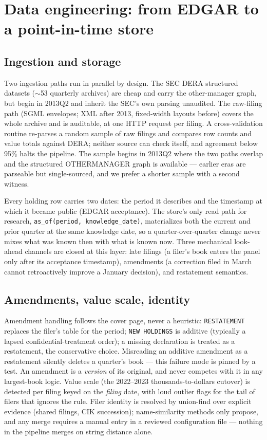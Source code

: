 \section{Data engineering: from EDGAR to a point-in-time store}
\label{sec:data}

\subsection{Ingestion and storage}

Two ingestion paths run in parallel by design. The SEC DERA
structured datasets ($\sim$53 quarterly archives) are cheap and carry
the other-manager graph, but begin in 2013Q2 and inherit the SEC's
own parsing unaudited. The raw-filing path (SGML envelopes; XML after
2013, fixed-width layouts before) covers the whole archive and is
auditable, at one HTTP request per filing. A cross-validation routine
re-parses a random sample of raw filings and compares row counts and
value totals against DERA; neither source can check itself, and
agreement below 95\% halts the pipeline. The sample begins in 2013Q2
where the two paths overlap and the structured OTHERMANAGER graph is
available --- earlier eras are parseable but single-sourced, and we
prefer a shorter sample with a second witness.

Every holding row carries two dates: the period it describes and the
timestamp at which it became public (EDGAR acceptance). The store's
only read path for research, \texttt{as\_of(period, knowledge\_date)},
materializes both the current and prior quarter at the same knowledge
date, so a quarter-over-quarter change never mixes what was known
then with what is known now. Three mechanical look-ahead channels are
closed at this layer: late filings (a filer's book enters the panel
only after its acceptance timestamp), amendments (a correction
filed in March cannot retroactively improve a January decision), and
restatement semantics.

\subsection{Amendments, value scale, identity}

Amendment handling follows the cover page, never a heuristic:
\texttt{RESTATEMENT} replaces the filer's table for the period;
\texttt{NEW HOLDINGS} is additive (typically a lapsed
confidential-treatment order); a missing declaration is treated as a
restatement, the conservative choice. Misreading an additive
amendment as a restatement silently deletes a quarter's book ---
this failure mode is pinned by a test. An amendment is a
\emph{version} of its original, and never competes with it in any
largest-book logic. Value scale (the 2022--2023 thousands-to-dollars
cutover) is detected per filing keyed on the \emph{filing} date, with
loud outlier flags for the tail of filers that ignores the rule.
Filer identity is resolved by union-find over explicit evidence
(shared filings, CIK succession); name-similarity methods only
propose, and any merge requires a manual entry in a reviewed
configuration file --- nothing in the pipeline merges on string
distance alone.

